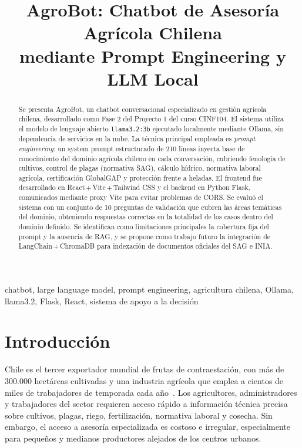 \documentclass{IEEEtran}
\title{AgroBot: Chatbot de Asesoría Agrícola Chilena\\
mediante Prompt Engineering y LLM Local}
\author{
  \IEEEauthorblockN{Cristóbal Flores Villegas,
                    Benjamin Peña Díaz,
                    Matías Muñoz Parraguirre,
                    Francisco Morales Díaz}
  \IEEEauthorblockA{
    \textit{Escuela de Informática, Ingeniería Civil Informática}\\
    \textit{Universidad Andrés Bello}\\
    Santiago, Chile\\
    \texttt{CINF104 -- Aprendizaje de Máquinas, 2026}
  }
}
\begin{document}
\maketitle

\begin{abstract}
Se presenta AgroBot, un chatbot conversacional especializado en gestión agrícola
chilena, desarrollado como Fase 2 del Proyecto 1 del curso CINF104.
El sistema utiliza el modelo de lenguaje abierto \texttt{llama3.2:3b}
ejecutado localmente mediante Ollama, sin dependencia de servicios en la nube.
La técnica principal empleada es \emph{prompt engineering}: un system prompt
estructurado de 210 líneas inyecta base de conocimiento del dominio agrícola
chileno en cada conversación, cubriendo fenología de cultivos, control de plagas
(normativa SAG), cálculo hídrico, normativa laboral agrícola, certificación
GlobalGAP y protección frente a heladas.
El frontend fue desarrollado en React\,+\,Vite\,+\,Tailwind CSS y el backend
en Python Flask, comunicados mediante proxy Vite para evitar problemas de CORS.
Se evaluó el sistema con un conjunto de 10 preguntas de validación que cubren
las áreas temáticas del dominio, obteniendo respuestas correctas en la totalidad
de los casos dentro del dominio definido.
Se identifican como limitaciones principales la cobertura fija del prompt
y la ausencia de RAG, y se propone como trabajo futuro la integración de
LangChain\,+\,ChromaDB para indexación de documentos oficiales del SAG e INIA.
\end{abstract}

\begin{IEEEkeywords}
chatbot, large language model, prompt engineering, agricultura chilena,
Ollama, llama3.2, Flask, React, sistema de apoyo a la decisión
\end{IEEEkeywords}

\section{Introducción}

Chile es el tercer exportador mundial de frutas de contraestación,
con más de 300.000 hectáreas cultivadas y una industria agrícola que
emplea a cientos de miles de trabajadores de temporada cada año~\cite{odepa2023}.
Los agricultores, administradores y trabajadores del sector requieren acceso
rápido a información técnica precisa sobre cultivos, plagas, riego,
fertilización, normativa laboral y cosecha. Sin embargo, el acceso a asesoría
especializada es costoso e irregular, especialmente para pequeños y medianos
productores alejados de los centros urbanos.
\end{document}
